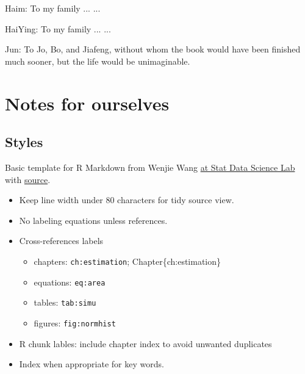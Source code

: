 \thispagestyle{empty}

\begin{center}
  Haim: To my family ... ...
  

  \bigskip

  HaiYing: To my family ... ...

  \bigskip

  Jun: To Jo, Bo, and Jiafeng, without whom the book would have been finished
  much sooner, but the life would be unimaginable.
  
\end{center}


{
\hypersetup{linkcolor=}
\setcounter{tocdepth}{2}
\tableofcontents
}

\hypertarget{notes-for-ourselves}{%
\chapter*{Notes for ourselves}\label{notes-for-ourselves}}


\hypertarget{styles}{%
\section*{Styles}\label{styles}}


Basic template for R Markdown from Wenjie Wang
\href{https://statds.org/template/}{at Stat Data Science Lab} with
\href{https://github.com/statds/dslab-templates/}{source}.

\begin{itemize}
\tightlist
\item
  Keep line width under 80 characters for tidy source view.
\item
  No labeling equations unless references.
\item
  Cross-references labels

  \begin{itemize}
  \tightlist
  \item
    chapters: \texttt{ch:estimation}; Chapter\textasciitilde@ref\{ch:estimation\}
  \item
    equations: \texttt{eq:area}
  \item
    tables: \texttt{tab:simu}
  \item
    figures: \texttt{fig:normhist}
  \end{itemize}
\item
  R chunk lables: include chapter index to avoid unwanted duplicates
\item
  Index when appropriate for key words.
\end{itemize}

